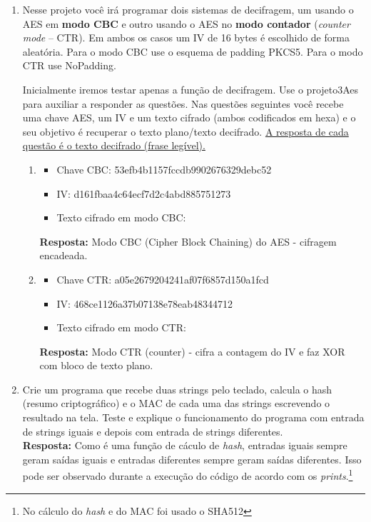 \documentclass[12pt,a4paper]{article}
\begin{document}
\begin{enumerate}
			\item[3.] Nesse projeto você irá programar dois sistemas de decifragem, um usando o AES em \textbf{modo CBC} e outro usando o AES no \textbf{modo contador} (\textit{counter mode} -- CTR). Em ambos os casos um IV de 16 bytes é escolhido de forma aleatória. Para o modo CBC use o esquema de padding PKCS5. Para o modo CTR use NoPadding.
			
				Inicialmente iremos testar apenas a função de decifragem. Use o projeto3Aes para auxiliar a responder as questões. Nas questões seguintes você recebe uma chave AES, um IV e um texto cifrado (ambos
codificados em hexa) e o seu objetivo é recuperar o texto plano/texto decifrado. \uline{A resposta de cada questão é o texto decifrado (frase legível).}
				
				\begin{enumerate}
					\item[3.1.] 
						\begin{itemize}
							\item Chave CBC: 53efb4b1157fccdb9902676329debc52
							\item IV: d161fbaa4c64ecf7d2c4abd885751273
							\item Texto cifrado em modo CBC: 
						\end{itemize}
						
						\textbf{Resposta:} Modo CBC (Cipher Block Chaining) do AES - cifragem encadeada.
						
					\item[3.2.]
						\begin{itemize}
							\item Chave CTR: a05e2679204241af07f6857d150a1fcd
							\item IV: 468ce1126a37b07138e78eab48344712
							\item Texto cifrado em modo CTR: 
						\end{itemize}
						
						\textbf{Resposta:} Modo CTR (counter) - cifra a contagem do IV e faz XOR com bloco de texto plano.
				\end{enumerate}
			
			\item[4.] Crie um programa que recebe duas strings pelo teclado, calcula o hash (resumo criptográfico) e o MAC de cada uma das strings escrevendo o resultado na tela. Teste e explique o funcionamento do programa com entrada de strings iguais e depois com entrada de strings diferentes.\\
			\textbf{Resposta:} Como é uma função de cáculo de \textit{hash}, entradas iguais sempre geram saídas iguais e entradas diferentes sempre geram saídas diferentes. Isso pode ser observado durante a execução do código de acordo com os \textit{prints}.\footnote{No cálculo do \textit{hash} e do MAC foi usado o SHA512}
			

\end{enumerate}
\end{document}
